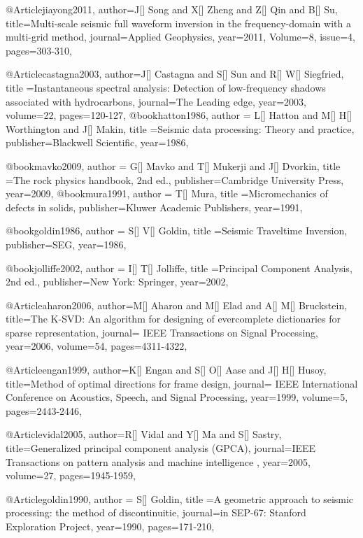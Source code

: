 @Article{jiayong2011,
  author={J[] Song and X[] Zheng and Z[] Qin and B[] Su},
  title={Multi-scale seismic full waveform inversion in the frequency-domain with a multi-grid method},
  journal={Applied Geophysics},
  year=2011,
  Volume=8,
  issue=4,
  pages={303-310},
}

@Article{castagna2003,
  author={J[] Castagna and S[] Sun and R[] W[] Siegfried},
  title ={Instantaneous spectral
analysis: Detection of low-frequency shadows associated with hydrocarbons},
  journal={The Leading edge},
  year=2003,
  volume=22,
  pages={120-127},
}
@book{hatton1986,
  author = {L[] Hatton and M[] H[] Worthington and J[] Makin},
  title ={Seismic data processing: Theory and practice},
  publisher={Blackwell Scientific},
  year=1986,
}

@book{mavko2009,
  author = {G[] Mavko and T[] Mukerji and J[] Dvorkin},
  title ={The rock physics handbook, 2nd ed.},
  publisher={Cambridge University Press},
  year=2009,
}
@book{mura1991,
  author = {T[] Mura},
  title ={Micromechanics of defects in solids},
  publisher={Kluwer Academic Publishers},
  year=1991,
}


@book{goldin1986,
  author = {S[] V[] Goldin},
  title ={Seismic Traveltime Inversion},
  publisher={SEG},
  year=1986,
}

@book{jolliffe2002,
  author = {I[] T[] Jolliffe},
  title ={Principal Component Analysis, 2nd ed.},
  publisher={New York: Springer},
  year=2002,
}

@Article{aharon2006,
  author={M[] Aharon and M[] Elad and A[] M[] Bruckstein},
  title={The {K}-{SVD}: An algorithm for designing of evercomplete dictionaries for sparse representation},
  journal={ IEEE Transactions on Signal Processing},
  year=2006,
  volume=54,
  pages={4311-4322},
}

@Article{engan1999,
  author={K[] Engan and S[] O[] Aase and J[] H[] Husoy},
  title={Method of optimal directions for frame design},
  journal={ IEEE International Conference on Acoustics, Speech, and Signal Processing},
  year=1999,
  volume=5,
  pages={2443-2446},
}

@Article{vidal2005,
  author={R[] Vidal and Y[] Ma and S[] Sastry},
  title={Generalized principal component analysis (GPCA)},
  journal={IEEE Transactions on pattern analysis and machine intelligence
},
  year=2005,
  volume=27,
  pages={1945-1959},
}

@Article{goldin1990,
  author = {S[] Goldin},
  title ={A geometric approach to seismic processing: the method of discontinuitie},
  journal={in SEP-67: Stanford Exploration Project},
  year=1990,
  pages={171-210},
}

